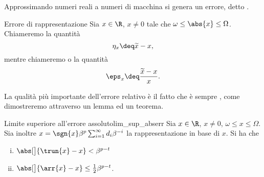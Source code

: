 Approssimando numeri reali a numeri di macchina si genera un errore, detto .

\begin{definition}
    {Errore di rappresentazione}{}
    Sia $x \in \R$, $x \neq 0$ tale che $\omega \leq \abs{x} \leq \Omega$. Chiameremo  la quantità \[
        \eta_x \deq \tilde{x} - x,
    \] mentre chiameremo  o  la quantità \[
        \eps_x \deq \frac{\tilde{x} - x}{x}.
    \]
\end{definition}

La qualità più importante dell'errore relativo è il fatto che è sempre , come dimostreremo attraverso un lemma ed un teorema.

\begin{lemma}
    {Limite superiore all'errore assoluto}{lim_sup_abserr} 
    Sia $x \in \R$, $x \neq 0$, $\omega \leq x \leq \Omega$. Sia inoltre $x = \sgn{x}\beta^p\sum_{i=1}^\infty d_i\beta^{-i}$ la rappresentazione in base di $x$. Si ha che 
    \begin{enumerate}[(i)]
        \item $\abs[\big]{\trun{x} - x} < \beta^{p-t}$
        \item $\abs[\big]{\arr{x} - x} \leq \frac12\beta^{p-t}$.  
    \end{enumerate}
\end{lemma}
